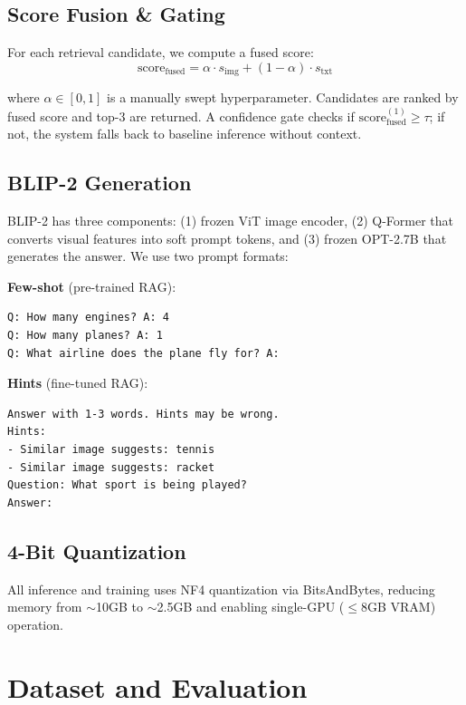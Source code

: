 \documentclass[12pt, a4paper]{article}
\begin{document}
\subsection{Score Fusion \& Gating}

For each retrieval candidate, we compute a fused score:
\begin{equation}
    \text{score}_{\text{fused}} = \alpha \cdot s_{\text{img}} + (1 - \alpha) \cdot s_{\text{txt}}
\end{equation}

where $\alpha \in [0,1]$ is a manually swept hyperparameter. Candidates are ranked by fused score and top-3 are returned. A confidence gate checks if $\text{score}_{\text{fused}}^{(1)} \geq \tau$; if not, the system falls back to baseline inference without context.

\subsection{BLIP-2 Generation}

BLIP-2 has three components: (1) frozen ViT image encoder, (2) Q-Former that converts visual features into soft prompt tokens, and (3) frozen OPT-2.7B that generates the answer. We use two prompt formats:

\textbf{Few-shot} (pre-trained RAG):
\begin{lstlisting}[language={}]
Q: How many engines? A: 4
Q: How many planes? A: 1
Q: What airline does the plane fly for? A:
\end{lstlisting}

\textbf{Hints} (fine-tuned RAG):
\begin{lstlisting}[language={}]
Answer with 1-3 words. Hints may be wrong.
Hints:
- Similar image suggests: tennis
- Similar image suggests: racket
Question: What sport is being played?
Answer:
\end{lstlisting}

\subsection{4-Bit Quantization}

All inference and training uses NF4 quantization via BitsAndBytes, reducing memory from $\sim$10GB to $\sim$2.5GB and enabling single-GPU ($\leq$8GB VRAM) operation.

\section{Dataset and Evaluation}
\end{document}
